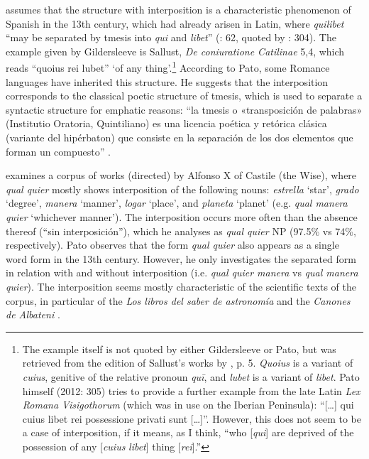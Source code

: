   \citet{Pato2012} assumes that the structure with interposition is a characteristic phenomenon of Spanish in the 13th century, which had already arisen in Latin, where \textit{quilibet} “may be separated by tmesis into \textit{qui} and \textit{libet}” (\citealt{GildersleeveLodge1900}: 62, quoted by \citealt{Pato2012}: 304). The example given by Gildersleeve is Sallust, \textit{De coniuratione Catilinae} 5,4, which reads “quoius rei lubet” ‘of any thing’.\footnote{The example itself is not quoted by either Gildersleeve or Pato, but was retrieved from the edition of Sallust’s works by \citet{Ahlberg1919}, p. 5. \textit{Quoius} is a variant of \textit{cuius}, genitive of the relative pronoun \textit{quī}, and \textit{lubet} is a variant of \textit{libet}. {Pato himself (2012: 305) tries to provide a further example from the late Latin}{ }\textit{Lex Romana Visigothorum} (which was in use on the Iberian Peninsula): “[…] qui cuius libet rei possessione privati sunt […]”. However, this does not seem to be a case of interposition, if it means, as I think, “who [\textit{qui}] are deprived of the possession of any [\textit{cuius} \textit{libet}] thing [\textit{rei}].”} According to Pato, some Romance languages have inherited this structure. He suggests that the interposition corresponds to the classical poetic structure of tmesis, which is used to separate a syntactic structure for emphatic reasons: “la tmesis o «transposición de palabras» (Institutio Oratoria, Quintiliano) es una licencia poética y retórica clásica (variante del hipérbaton) que consiste en la separación de los dos elementos que forman un compuesto” \citep[280]{Pato2012}.

  \citet{Pato2012} examines a corpus of works (directed) by Alfonso X of Castile (the Wise), where \textit{qual quier} mostly shows interposition of the following nouns: \textit{estrella} ‘star’, \textit{grado} ‘degree’, \textit{manera} ‘manner’, \textit{logar} ‘place’, and \textit{planeta} ‘planet’ (e.g. \textit{qual manera quier} ‘whichever manner’). The interposition occurs more often than the absence thereof (“sin interposición”), which he analyses as \textit{qual quier} NP (97.5\% vs 74\%, respectively). Pato observes that the form \textit{qual quier} also appears as a single word form in the 13th century. However, he only investigates the separated form in relation with and without interposition (i.e. \textit{qual quier manera} vs \textit{qual manera quier}). The interposition seems mostly characteristic of the scientific texts of the corpus, in particular of the \textit{Los libros del saber de astronomía} and the \textit{Canones de Albateni} \citep[301]{Pato2012}. 


